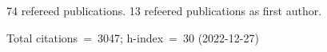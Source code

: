 74 refereed publications. 13 refeered publications as first author.

Total citations~=~3047; h-index~=~30 (2022-12-27)